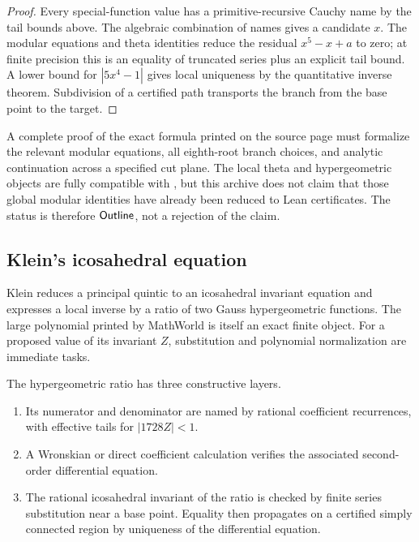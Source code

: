 \begin{proof}
Every special-function value has a primitive-recursive Cauchy name by the tail
bounds above.  The algebraic combination of names gives a candidate \(x\).
The modular equations and theta identities reduce the residual
\(x^5-x+a\) to zero; at finite precision this is an equality of truncated
series plus an explicit tail bound.  A lower bound for \(|5x^4-1|\) gives local
uniqueness by the quantitative inverse theorem.  Subdivision of a certified
path transports the branch from the base point to the target.
\end{proof}

\begin{frontier}
A complete proof of the exact formula printed on the source page must formalize
the relevant modular equations, all eighth-root branch choices, and analytic
continuation across a specified cut plane.  The local theta and hypergeometric
objects are fully compatible with \ipra{}, but this archive does not claim that
those global modular identities have already been reduced to Lean certificates.
The status is therefore \(\textsf{Outline}\), not a rejection of the claim.
\end{frontier}

\subsection{Klein's icosahedral equation}

Klein reduces a principal quintic to an icosahedral invariant equation and
expresses a local inverse by a ratio of two Gauss hypergeometric functions.  The
large polynomial printed by MathWorld is itself an exact finite object.  For a
proposed value of its invariant \(Z\), substitution and polynomial
normalization are immediate \ipra{} tasks.

The hypergeometric ratio has three constructive layers.

\begin{enumerate}
\item Its numerator and denominator are named by rational coefficient
      recurrences, with effective tails for \(|1728Z|<1\).
\item A Wronskian or direct coefficient calculation verifies the associated
      second-order differential equation.
\item The rational icosahedral invariant of the ratio is checked by finite
      series substitution near a base point.  Equality then propagates on a
      certified simply connected region by uniqueness of the differential
      equation.
\end{enumerate}


